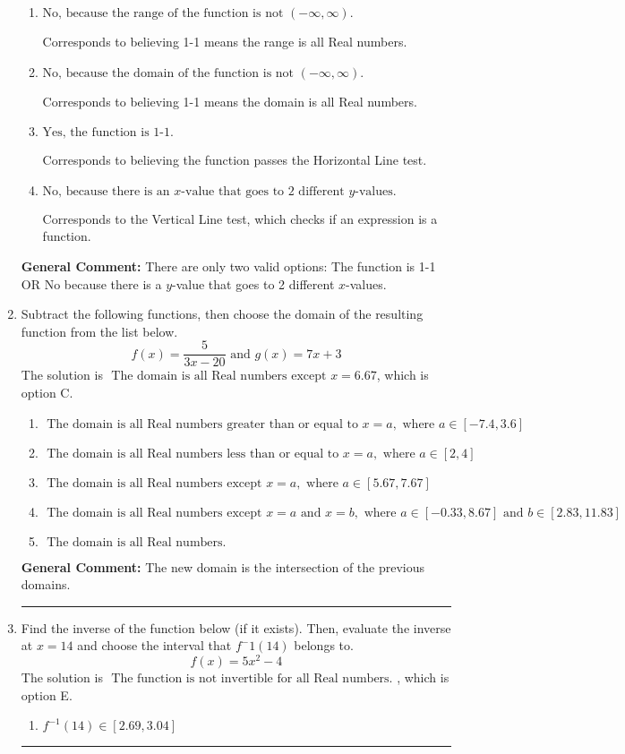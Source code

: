 \documentclass{extbook}[14pt]
\newcommand{\litem}[1]{\item #1

\rule{\textwidth}{0.4pt}}
\begin{document}
\begin{enumerate}
{\begin{enumerate}[label=\Alph*.]
* This is the solution.
\item \( \text{No, because the range of the function is not $(-\infty, \infty)$.} \)

Corresponds to believing 1-1 means the range is all Real numbers.
\item \( \text{No, because the domain of the function is not $(-\infty, \infty)$.} \)

Corresponds to believing 1-1 means the domain is all Real numbers.
\item \( \text{Yes, the function is 1-1.} \)

Corresponds to believing the function passes the Horizontal Line test.
\item \( \text{No, because there is an $x$-value that goes to 2 different $y$-values.} \)

Corresponds to the Vertical Line test, which checks if an expression is a function.
\end{enumerate}

\textbf{General Comment:} There are only two valid options: The function is 1-1 OR No because there is a $y$-value that goes to 2 different $x$-values.
}
\litem{
Subtract the following functions, then choose the domain of the resulting function from the list below.
\[ f(x) = \frac{5}{3x-20} \text{ and } g(x) = 7x + 3 \]The solution is \( \text{ The domain is all Real numbers except } x = 6.67 \), which is option C.\begin{enumerate}[label=\Alph*.]
\item \( \text{ The domain is all Real numbers greater than or equal to } x = a, \text{ where } a \in [-7.4, 3.6] \)


\item \( \text{ The domain is all Real numbers less than or equal to } x = a, \text{ where } a \in [2, 4] \)


\item \( \text{ The domain is all Real numbers except } x = a, \text{ where } a \in [5.67, 7.67] \)


\item \( \text{ The domain is all Real numbers except } x = a \text{ and } x = b, \text{ where } a \in [-0.33, 8.67] \text{ and } b \in [2.83, 11.83] \)


\item \( \text{ The domain is all Real numbers. } \)


\end{enumerate}

\textbf{General Comment:} The new domain is the intersection of the previous domains.
}
\litem{
Find the inverse of the function below (if it exists). Then, evaluate the inverse at $x = 14$ and choose the interval that $f^-1(14)$ belongs to.
\[ f(x) = 5 x^2 - 4 \]The solution is \( \text{ The function is not invertible for all Real numbers. } \), which is option E.\begin{enumerate}[label=\Alph*.]
\item \( f^{-1}(14) \in [2.69, 3.04] \)


\end{enumerate}}
\end{enumerate}
\end{document}
